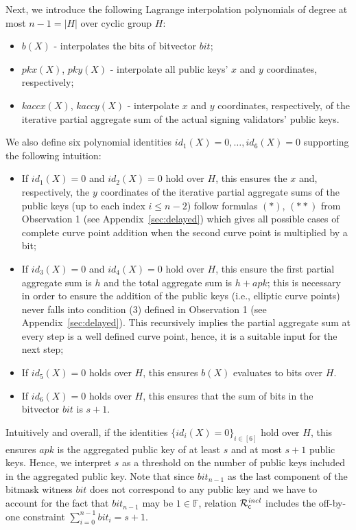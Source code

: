 \noindent Next, we introduce the following Lagrange interpolation polynomials of degree at most $n-1 = |H|$ over cyclic group $H$: 
\begin{itemize}
\item $b(X)$ - interpolates the bits of bitvector $\mathit{bit}$; 
\item $pkx(X)$, $pky(X)$ - interpolate all public keys' $x$ and $y$ coordinates, respectively; 
\item $kaccx(X)$, $kaccy(X)$ - interpolate $x$ and $y$ coordinates, respectively, 
of the iterative partial aggregate sum of the actual signing validators' public keys. 
\end{itemize}
\noindent We also define six polynomial identities $id_1(X)=0, \ldots, id_6(X)=0$ supporting the following intuition:
\begin{itemize}
\item If $id_1(X)=0$ and $id_2(X)=0$ hold over $H$, this 
ensures the $x$ and, respectively, the $y$ coordinates of the iterative partial 
aggregate sums of the public keys (up to each index $i \leq n-2$) follow formulas $(\ast)$, $(\ast\ast)$ from Observation 1 (see Appendix~\ref{sec:delayed}) 
which gives all possible cases of complete curve point addition when the second curve point is multiplied by a bit; 
\item If $id_3(X)=0$ and $id_4(X)=0$ hold over $H$, this  
ensure the first partial aggregate sum is $h$ and the total aggregate sum is $h + \mathit{apk}$; this is necessary in order to ensure the 
addition of the public keys (i.e., elliptic curve points) never falls into condition (3) defined in Observation 1 (see Appendix~\ref{sec:delayed}). 
This recursively implies the partial aggregate sum at every step is a well defined curve point, hence, it is a suitable input for the next step; 
\item If $id_5(X)=0$ holds over $H$, this 
ensures $b(X)$ evaluates to bits over $H$. 
\item If $id_6(X)= 0$ holds  over $H$, this 
ensures that the sum of bits in the bitvector $\mathit{bit}$ is $s+1$.
\end{itemize}

\noindent Intuitively and overall, if the identities $\{id_i(X)=0\}_{i \in [6]}$ hold over $H$, this 
ensures $\mathit{apk}$ is the aggregated public key of at least $s$ and at most $s+1$ public keys. 
Hence, we interpret $s$ as a threshold on the number of public keys included in the aggregated public key. 
Note that since $\mathit{bit_{n-1}}$ as the last component of the bitmask witness $\mathit{bit}$ does not correspond to any public 
key and we have to account for the fact that $\mathit{bit_{n-1}}$ may be 
$1 \in \mathbb{F}$, relation $\mathcal{R}^{\mathit{incl}}_{\mathsf{c}}$ includes the off-by-one constraint $\sum_{i=0}^{n-1} \mathit{bit_i} = s+1$.\\

